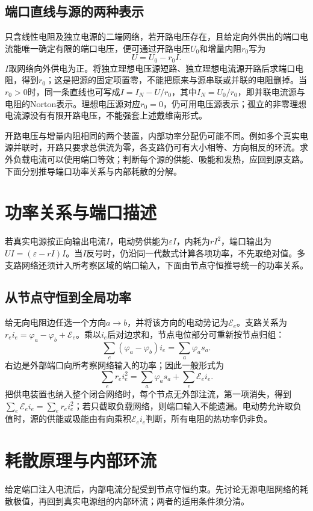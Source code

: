 \subsection{端口直线与源的两种表示}
只含线性电阻及独立电源的二端网络，若开路电压存在，且给定向外供出的端口电流能唯一确定有限的端口电压，便可通过开路电压$U_0$和增量内阻$r_0$写为
\[
 U=U_0-r_0I.
\]
$I$取网络向外供电为正。将独立理想电压源短路、独立理想电流源开路后求端口电阻，得到$r_0$；这是把源的固定项置零，不能把原来与源串联或并联的电阻删掉。当$r_0>0$时，同一条直线也可写成$I=I_N-U/r_0$，其中$I_N=U_0/r_0$，即并联电流源与电阻的Norton表示。理想电压源对应$r_0=0$，仍可用电压源表示；孤立的非零理想电流源没有有限开路电压，不能强套上述戴维南形式。

开路电压与增量内阻相同的两个装置，内部功率分配仍可能不同。例如多个真实电源并联时，开路只要求总供流为零，各支路仍可有大小相等、方向相反的环流。求外负载电流可以使用端口等效；判断每个源的供能、吸能和发热，应回到原支路。下面分别推导端口功率关系与内部耗散的分解。

\section{功率关系与端口描述}
若真实电源按正向输出电流$I$，电动势供能为$\varepsilon I$，内耗为$rI^2$，端口输出为$UI=(\varepsilon-rI)I$。当$I$反号时，仍沿同一代数式计算各项功率，不先取绝对值。多支路网络还须计入所考察区域的端口输入，下面由节点守恒推导统一的功率关系。





\subsection{从节点守恒到全局功率}
给无向电阻边任选一个方向$a\to b$，并将该方向的电动势记为$\mathcal E_e$。支路关系为$r_ei_e=\varphi_a-\varphi_b+\mathcal E_e$。乘以$i_e$后对边求和，节点电位部分可重新按节点归组：
\[
 \sum_e(\varphi_a-\varphi_b)i_e=\sum_a\varphi_as_a.
\]
右边是外部端口向所考察网络输入的功率；因此一般形式为
\[
 \sum_e r_ei_e^2=\sum_a\varphi_as_a+\sum_e\mathcal E_ei_e.
\]
把供电装置也纳入整个闭合网络时，每个节点无外部注流，第一项消失，得到$\sum_e\mathcal E_ei_e=\sum_er_ei_e^2$；若只截取负载网络，则端口输入不能遗漏。电动势允许取负值时，源的供能或吸能由有向乘积$\mathcal E_ei_e$判断，所有电阻的热功率仍非负。


\section{耗散原理与内部环流}
给定端口注入电流后，内部电流分配受到节点守恒约束。先讨论无源电阻网络的耗散极值，再回到真实电源组的内部环流；两者的适用条件须分清。

